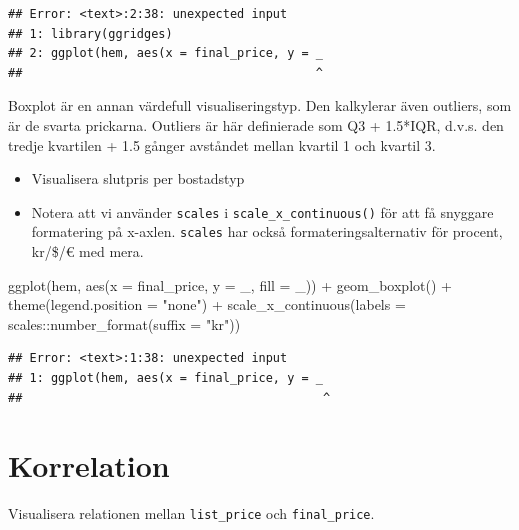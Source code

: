 \documentclass[
]{book}
\newenvironment{Shaded}{\begin{snugshade}}{\end{snugshade}}
\newcommand{\AttributeTok}[1]{\textcolor[rgb]{0.77,0.63,0.00}{#1}}
\newcommand{\FunctionTok}[1]{\textcolor[rgb]{0.00,0.00,0.00}{#1}}
\newcommand{\NormalTok}[1]{#1}
\newcommand{\SpecialCharTok}[1]{\textcolor[rgb]{0.00,0.00,0.00}{#1}}
\newcommand{\StringTok}[1]{\textcolor[rgb]{0.31,0.60,0.02}{#1}}
\providecommand{\tightlist}{%
  \setlength{\itemsep}{0pt}\setlength{\parskip}{0pt}}
\begin{document}
\begin{verbatim}
## Error: <text>:2:38: unexpected input
## 1: library(ggridges)
## 2: ggplot(hem, aes(x = final_price, y = _
##                                         ^
\end{verbatim}

Boxplot är en annan värdefull visualiseringstyp. Den kalkylerar även outliers, som är de svarta prickarna. Outliers är här definierade som Q3 + 1.5*IQR, d.v.s. den tredje kvartilen + 1.5 gånger avståndet mellan kvartil 1 och kvartil 3.

\begin{itemize}
\tightlist
\item
  Visualisera slutpris per bostadstyp
\item
  Notera att vi använder \texttt{scales} i \texttt{scale\_x\_continuous()} för att få snyggare formatering på x-axlen. \texttt{scales} har också formateringsalternativ för procent, kr/\$/€ med mera.
\end{itemize}

\begin{Shaded}
\begin{Highlighting}[]
\FunctionTok{ggplot}\NormalTok{(hem, }\FunctionTok{aes}\NormalTok{(}\AttributeTok{x =}\NormalTok{ final\_price, }\AttributeTok{y =}\NormalTok{ \_, }\AttributeTok{fill =}\NormalTok{ \_)) }\SpecialCharTok{+}
  \FunctionTok{geom\_boxplot}\NormalTok{() }\SpecialCharTok{+} 
  \FunctionTok{theme}\NormalTok{(}\AttributeTok{legend.position =} \StringTok{"none"}\NormalTok{) }\SpecialCharTok{+}
  \FunctionTok{scale\_x\_continuous}\NormalTok{(}\AttributeTok{labels =}\NormalTok{ scales}\SpecialCharTok{::}\FunctionTok{number\_format}\NormalTok{(}\AttributeTok{suffix =} \StringTok{"kr"}\NormalTok{))}
\end{Highlighting}
\end{Shaded}

\begin{verbatim}
## Error: <text>:1:38: unexpected input
## 1: ggplot(hem, aes(x = final_price, y = _
##                                          ^
\end{verbatim}

\hypertarget{korrelation}{%
\section{Korrelation}\label{korrelation}}

Visualisera relationen mellan \texttt{list\_price} och \texttt{final\_price}.
\end{document}
